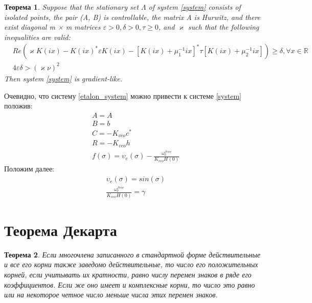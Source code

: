 \documentclass[a4paper]{article}
\newtheorem{theorem}{Теорема}
\begin{document}
\begin{theorem}
Suppose that the stationary set $\Lambda$ of system \eqref{system} consists of isolated points, the pair (A, B) is controllable, the matrix A is Hurwitz, and there exist diagonal m × m matrices $\varepsilon > 0, \delta > 0, \tau \geq 0$, and $\varkappa$ such that the following inequalities are valid:
 \begin{equation}
 \begin{aligned}
&Re(\varkappa K(ix)-K(ix)^*\varepsilon K(ix)-[K(ix)+\mu_1^{-1}ix]^*\tau[K(ix)+\mu_2^{-1}ix])\geq\delta, \forall x \in \mathbb{R}\\
&4\varepsilon\delta > (\varkappa\nu)^2
 \end{aligned}
\end{equation}
Then system \eqref{system} is gradient-like.
\end{theorem}

Очевидно, что систему \eqref{etalon_system} можно привести к системе  \eqref{system} положив: 
 \begin{equation}
 \begin{aligned}
&A=A\\
&B = b\\
&C = -K_{vco}c^*\\
&R = -K_{vco}h\\
&f(\sigma) = \upsilon_e(\sigma) - \frac{\omega_e^{free}}{K_{vco}H(0)}
\end{aligned}
\end{equation}
Положим далее:
 \begin{equation}
 \begin{aligned}
&\upsilon_e(\sigma) =  sin(\sigma)\\
&\frac{\omega_e^{free}}{K_{vco}H(0)} = \gamma
\end{aligned}
\end{equation}
\section{Теорема Декарта}
\begin{theorem}
Если многочлена записанного в стандартной форме действительные и все его корни также заведомо действительные, то число его положительных корней, если учитывать их кратности, равно числу перемен знаков в ряде его коэффициентов. Если же оно имеет и комплексные корни, то число это равно или на некоторое четное число меньше числа этих перемен знаков.
\end{theorem}
\end{document}
